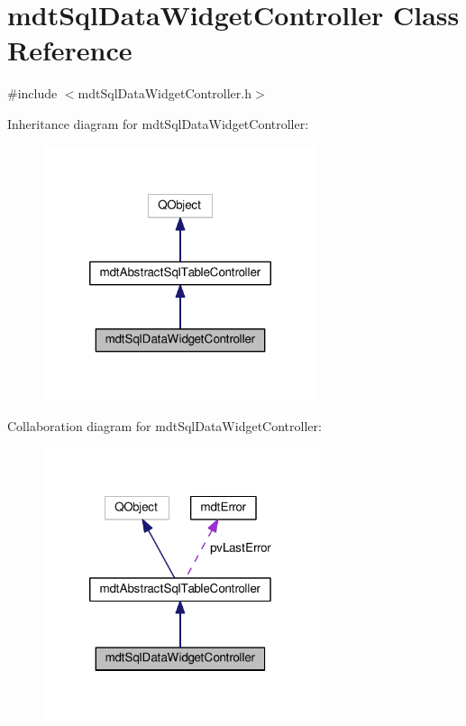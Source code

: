 \hypertarget{classmdt_sql_data_widget_controller}{\section{mdt\-Sql\-Data\-Widget\-Controller Class Reference}
\label{classmdt_sql_data_widget_controller}
}


{\ttfamily \#include $<$mdt\-Sql\-Data\-Widget\-Controller.\-h$>$}



Inheritance diagram for mdt\-Sql\-Data\-Widget\-Controller\-:\nopagebreak
\begin{figure}[H]
\begin{center}
\leavevmode
\includegraphics[width=228pt]{classmdt_sql_data_widget_controller__inherit__graph}
\end{center}
\end{figure}


Collaboration diagram for mdt\-Sql\-Data\-Widget\-Controller\-:\nopagebreak
\begin{figure}[H]
\begin{center}
\leavevmode
\includegraphics[width=230pt]{classmdt_sql_data_widget_controller__coll__graph}
\end{center}
\end{figure}
